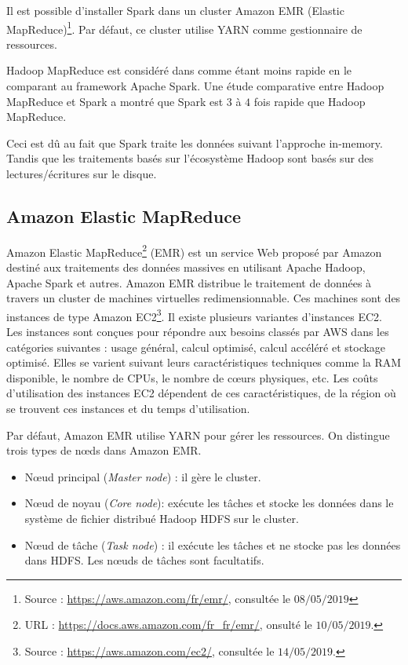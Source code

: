 Il est possible d'installer Spark dans un cluster Amazon EMR (Elastic MapReduce)\footnote{Source : \url{https://aws.amazon.com/fr/emr/}, consultée le $08/05/2019$}. Par défaut, ce cluster utilise YARN comme gestionnaire de ressources.

Hadoop MapReduce est considéré dans \cite{Global-Journals} comme étant moins rapide en le comparant au framework Apache Spark.  Une étude \cite{article-comparaison-spark-hadoop} comparative entre Hadoop MapReduce et Spark a montré que Spark est $ 3 $ à $ 4 $ fois rapide que Hadoop MapReduce.

 Ceci est dû au fait que Spark traite les données suivant l'approche in-memory. Tandis que  les traitements basés sur l'écosystème Hadoop sont basés sur des lectures/écritures sur le disque.  
\subsection{Amazon Elastic MapReduce} \label{emr-aws-presentation}

Amazon Elastic MapReduce\footnote{URL : \url{https://docs.aws.amazon.com/fr_fr/emr/}, onsulté le $10/05/2019$.} (EMR) est  un service Web proposé par Amazon  destiné aux traitements des données massives en utilisant Apache Hadoop, Apache Spark et autres.
Amazon EMR distribue le traitement de données à travers un cluster  de machines virtuelles redimensionnable. Ces machines sont des instances de type Amazon EC2\footnote{Source : \url{https://aws.amazon.com/ec2/}, consultée le $14/05/2019$.}.
Il existe plusieurs variantes d'instances EC2. Les instances sont conçues pour répondre 
aux besoins classés par AWS dans les catégories suivantes : usage général, calcul optimisé, calcul accéléré et stockage optimisé.
Elles se varient suivant leurs caractéristiques techniques comme la  RAM disponible, le nombre de CPUs, le nombre de c\oe{}urs physiques, etc. Les coûts d'utilisation des instances EC2 dépendent de ces caractéristiques,  de la région où se trouvent ces instances et du temps d'utilisation. 

Par défaut, Amazon EMR utilise YARN pour gérer les ressources. On distingue trois types de n\oe{}ds dans Amazon EMR. 
\begin{itemize}
	\item N\oe{}ud principal (\textit{Master node}) : il gère le cluster.
	\item N\oe{}ud de noyau (\textit{Core node}): exécute les tâches et stocke les données dans le système de fichier distribué Hadoop HDFS sur le cluster.
	\item N\oe{}ud de  tâche (\textit{Task node}) : il exécute les tâches et ne stocke pas les données dans HDFS. Les n\oe{}uds de tâches sont facultatifs.
\end{itemize}

